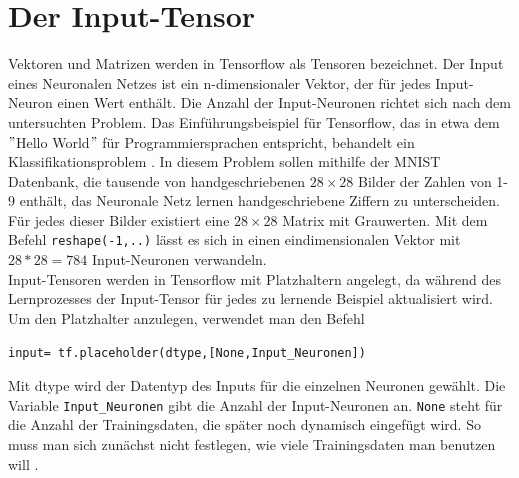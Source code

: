 \section{Der Input-Tensor}
Vektoren und Matrizen werden in Tensorflow als Tensoren bezeichnet. Der Input eines Neuronalen Netzes ist ein n-dimensionaler Vektor, der f\"ur jedes Input-Neuron einen Wert enth\"alt. Die Anzahl der Input-Neuronen richtet sich nach dem untersuchten Problem. Das Einf\"uhrungsbeispiel f\"ur Tensorflow, das in etwa dem $"$Hello World$"$ f\"ur Programmiersprachen entspricht, behandelt ein Klassifikationsproblem \cite{handson}. In diesem Problem sollen mithilfe der \gls{MNIST} Datenbank, die tausende von handgeschriebenen $28 \times 28$ Bilder der Zahlen von 1-9 enth\"alt, das Neuronale Netz lernen handgeschriebene Ziffern zu unterscheiden. F\"ur jedes dieser Bilder existiert eine $28 \times 28$ Matrix mit Grauwerten. Mit dem Befehl \lstinline$reshape(-1,..)$ \cite{handson} l\"asst es sich in einen eindimensionalen Vektor mit  $28*28=784$ Input-Neuronen verwandeln.\\
Input-Tensoren werden in Tensorflow mit Platzhaltern angelegt, da w\"ahrend des Lernprozesses der Input-Tensor f\"ur jedes zu lernende Beispiel aktualisiert wird. Um den Platzhalter anzulegen, verwendet man den Befehl \cite{cookbook}
\vspace{0.3cm}
\begin{lstlisting}
input= tf.placeholder(dtype,[None,Input_Neuronen])
\end{lstlisting}
Mit dtype wird der Datentyp des Inputs f\"ur die einzelnen Neuronen gew\"ahlt. Die Variable \lstinline$Input_Neuronen$ gibt die Anzahl der Input-Neuronen an. \lstinline$None$ steht f\"ur die Anzahl der Trainingsdaten, die sp\"ater noch dynamisch eingef\"ugt wird. So muss man sich zun\"achst nicht festlegen, wie viele Trainingsdaten man benutzen will \cite{handson}. 



